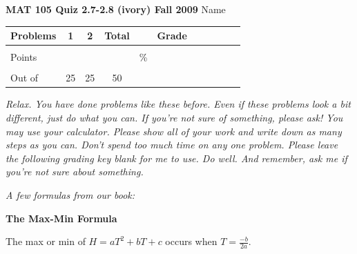 \documentclass[11pt]{article}
\begin{document}
{\bf MAT 105 Quiz 2.7-2.8 (ivory) Fall 2009} \hspace{.4in} {\large Name} \hrulefill

\hrulefill


\begin{center}

\begin{tabular}
{|l|c|c|c|c|c|c|c|c|c|c|} \hline

 Problems & \hspace{5 pt} 1 \hspace{5 pt}  & \hspace{5 pt} 2 \hspace{5 pt} &  \hspace{5 pt} Total  \hspace{5 pt} & &  \hspace{5 pt} Grade \hspace{5 pt}  \\ \hline
&&& &&\\  
Points &&& &    \hspace{.8in}\% &  \\ 
&&& && \\  \hline
Out of & 25 & 25  &50 & & \\ \hline

\end {tabular}
 
\end{center}

 \emph{Relax.  You have done problems like these before.  Even if these problems look a bit different, just do what you can.  If you're not sure of something, please ask! You may use your calculator.  Please show all of your work and write down as many steps as you can.  Don't spend too much time on any one problem.  Please leave the following grading key blank for me to use.  Do well.  And remember, ask me if you're not sure about something.}
 
 \vspace{.1in}
 
 \emph{A few formulas from our book:}
  \vspace{.2in}
 
  \begin{center}
\textbf{The Max-Min Formula}
\vspace{.1in}

The max or min of $H=aT^2+bT+c$ occurs when $\displaystyle T=\frac{-b}{2a}$.

 \end{center}
 
\end{document}
